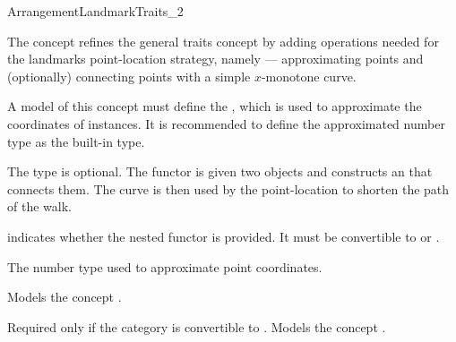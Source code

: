 
\ccRefPageBegin
\begin{ccRefConcept}{ArrangementLandmarkTraits_2}

\ccDefinition
The concept \ccRefName{} refines the general traits concept by adding
operations needed for the landmarks point-location strategy, namely ---
approximating points and (optionally) connecting points with a simple
$x$-monotone curve.

A model of this concept must define the , which
is used to approximate the coordinates of  instances. It is
recommended to define the approximated number type as the built-in
 type. 

The type  is optional. The functor
is given two  objects and constructs
an  that connects them. The curve is then
used by the point-location to shorten the path of the walk.

\ccRefines
{}

\ccTypes
  {indicates whether the nested functor  is
  provided. It must be convertible to  or .} 

%
  {The number type used to approximate point coordinates.}

\ccThreeToTwo
{}%
  {Models the concept .}

%
  {Required only if the  category is convertible to
  .
  Models the concept .}


 {}
\ccGlue
{}


\end{ccRefConcept}
